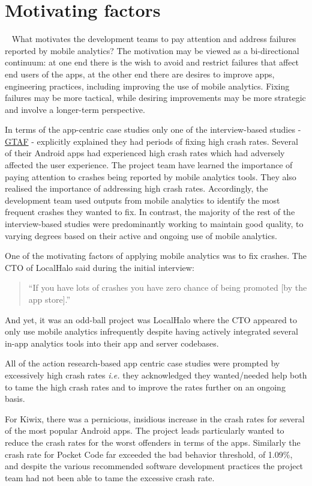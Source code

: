 \section{Motivating factors}~\label{aiu-motivating-factors-section}
What motivates the development teams to pay attention and address failures reported by mobile analytics? The motivation may be viewed as a bi-directional continuum: at one end there is the wish to avoid and restrict failures that affect end users of the apps, at the other end there are desires to improve apps, engineering practices, including improving the use of mobile analytics. Fixing failures may be more tactical, while desiring improvements may be more strategic and involve a longer-term perspective.

In terms of the app-centric case studies only one of the interview-based studies - \href{glossary-gtaf}{GTAF} - explicitly explained they had periods of fixing high crash rates. Several of their Android apps had experienced high crash rates which had adversely affected the user experience. The project team have learned the importance of paying attention to crashes being reported by mobile analytics tools. They also realised the importance of addressing high crash rates. Accordingly, the development team used outputs from mobile analytics to identify the most frequent crashes they wanted to fix. In contrast, the majority of the rest of the interview-based studies were predominantly working to maintain good quality, to varying degrees based on their active and ongoing use of mobile analytics.

One of the motivating factors of applying mobile analytics was to fix crashes. The CTO of LocalHalo said during the initial interview: 

\begin{quote}
    ``If you have lots of crashes you have zero chance of being promoted [by the app store].''
\end{quote}

And yet, it was an odd-ball project was LocalHalo where the CTO appeared to only use mobile analytics infrequently despite having actively integrated several in-app analytics tools into their app and server codebases.

All of the action research-based app centric case studies were prompted by excessively high crash rates \emph{i.e.} they acknowledged they wanted/needed help both to tame the high crash rates and to improve the rates further on an ongoing basis.

For Kiwix, there was a pernicious, insidious increase in the crash rates for several of the most popular Android apps. The project leads particularly wanted to reduce the crash rates for the worst offenders in terms of the apps. Similarly the crash rate for Pocket Code far exceeded the bad behavior threshold, of 1.09\%, and despite the various recommended software development practices the project team had not been able to tame the excessive crash rate.

